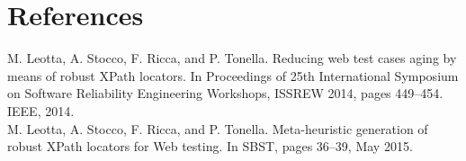 \documentclass[format=acmlarge, nonacm=true]{acmart}
\begin{document}
\section*{References}

M. Leotta, A. Stocco, F. Ricca, and P. Tonella. Reducing web test cases aging by means of robust XPath locators. In Proceedings of 25th International Symposium on Software Reliability Engineering Workshops, ISSREW 2014, pages 449–454. IEEE, 2014.\\
M. Leotta, A. Stocco, F. Ricca, and P. Tonella. Meta-heuristic generation of robust XPath locators for Web testing. In SBST, pages 36–39, May 2015.
\end{document}
